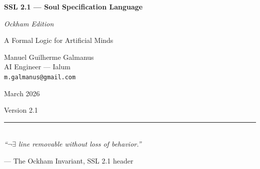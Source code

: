 \documentclass[12pt,a4paper]{article}
\theoremstyle{plain}
\theoremstyle{definition}
\theoremstyle{remark}
\begin{document}
\begin{titlepage}
\begin{center}

\vspace*{3cm}

{\Huge \textbf{SSL 2.1 --- Soul Specification Language}}

\vspace{0.8em}

{\LARGE \textit{Ockham Edition}}

\vspace{1em}

{\large A Formal Logic for Artificial Minds}

\vspace{3cm}

{\Large Manuel Guilherme Galmanus}\\[0.5em]
{\normalsize AI Engineer --- Ialum}\\[0.3em]
{\small \texttt{m.galmanus@gmail.com}}

\vspace{2cm}

{\large March 2026}

\vspace{1em}

{\small Version 2.1}

\vspace{3cm}

\rule{0.5\textwidth}{0.4pt}\\[1.5em]

\textit{``\(\neg\exists\) line removable without loss of behavior.''}

\vspace{0.8em}

{\small --- The Ockham Invariant, SSL 2.1 header}

\end{center}
\end{titlepage}
\end{document}
